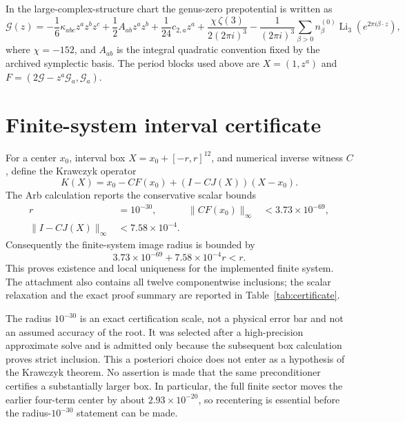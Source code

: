 \documentclass[11pt]{article}
\begin{document}
In the large-complex-structure chart the genus-zero prepotential is written
as
\begin{equation}
 \mathcal G(z)=-\frac16\kappa_{abc}z^az^bz^c
 +\frac12 A_{ab}z^az^b+\frac1{24}c_{2,a}z^a
 +\frac{\chi\,\zeta(3)}{2(2\pi i)^3}
 -\frac1{(2\pi i)^3}\sum_{\beta>0}n^{(0)}_\beta
   \operatorname{Li}_3(e^{2\pi i\beta\cdot z}),
\end{equation}
where $\chi=-152$, and $A_{ab}$ is the integral quadratic convention fixed
by the archived symplectic basis. The period blocks used above are
$X=(1,z^a)$ and $F=(2\mathcal G-z^a\mathcal G_a,\mathcal G_a)$.

\section{Finite-system interval certificate}

For a center $x_0$, interval box $X=x_0+[-r,r]^{12}$, and numerical inverse
witness $C$, define the Krawczyk operator \cite{Breiding2024,Moore2009}
\begin{equation}
 K(X)=x_0-CF(x_0)+(I-CJ(X))(X-x_0).
\end{equation}
The Arb calculation reports the conservative scalar bounds
\begin{align}
 r &=10^{-30}, &
 \lVert CF(x_0)\rVert_\infty &<3.73\times10^{-69},\\
 \lVert I-CJ(X)\rVert_\infty &<7.58\times10^{-4}.
\end{align}
Consequently the finite-system image radius is bounded by
\begin{equation}
 3.73\times10^{-69}+7.58\times10^{-4}r<r.
\end{equation}
This proves existence and local uniqueness for the implemented finite system.
The attachment also contains all twelve componentwise inclusions; the scalar
relaxation and the exact proof summary are reported in
Table~\ref{tab:certificate}.

The radius $10^{-30}$ is an exact certification scale, not a physical error
bar and not an assumed accuracy of the root.  It was selected after a
high-precision approximate solve and is admitted only because the subsequent
box calculation proves strict inclusion.  This a posteriori choice does not
enter as a hypothesis of the Krawczyk theorem.  No assertion is made that the
same preconditioner certifies a substantially larger box.  In particular, the
full finite sector moves the earlier four-term center by about
$2.93\times10^{-20}$, so recentering is essential before the radius-$10^{-30}$
statement can be made.
\end{document}
